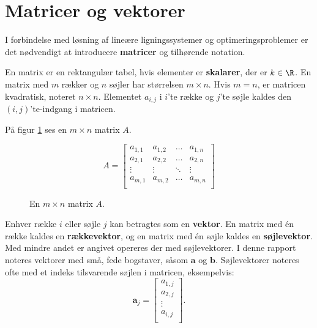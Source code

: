 \section{Matricer og vektorer}
%  
%
I forbindelse med løsning af lineære ligningssystemer og optimeringsproblemer er det nødvendigt at introducere \textbf{matricer} og tilhørende notation. 
%
\begin{defn}{}{}
En matrix er en rektangulær tabel, hvis elementer er \textbf{skalarer}, der er $k \in \R$. 
En matrix med $m$ rækker og $n$ søjler har størrelsen $m \times n$.
Hvis $m=n$, er matricen kvadratisk, noteret $n \times n$.
Elementet $a_{i,j}$ i $i$'te række og $j$'te søjle kaldes den $(i,j)$'te-indgang i matricen. 
\end{defn}
\noindent
%
På figur \ref{fig:matrix_gen_eks} ses en $m \times n$ matrix $A$.
%
\begin{figure}[H]
	\begin{center}
$$
A=
\begin{bmatrix}
a_{1,1} & a_{1,2} & \ldots & a_{1,n} \\
a_{2,1} & a_{2,2} & \ldots & a_{2,n} \\
\vdots  & \vdots  & \ddots & \vdots \\
a_{m,1} & a_{m,2} & \ldots & a_{m,n} \\
\end{bmatrix}
$$
	\end{center}
	\caption{En $m \times n$ matrix $A$.}
	\label{fig:matrix_gen_eks}
\end{figure}
\noindent
%
Enhver række $i$ eller søjle $j$ kan betragtes som en \textbf{vektor}. 
En matrix med én række kaldes en \textbf{rækkevektor}, og en matrix med én søjle kaldes en \textbf{søjlevektor}. 
Med mindre andet er angivet opereres der med søjlevektorer.
I denne rapport noteres vektorer med små, fede bogstaver, såsom $\textbf{a}$ og $\textbf{b}$. 
Søjlevektorer noteres ofte med et indeks tilsvarende søjlen i matricen, eksempelvis:
%
$$
\textbf{a}_j= 
\begin{bmatrix}
a_{1,j} \\
a_{2,j} \\
\vdots \\
a_{i,j} \\
\end{bmatrix}.
$$ 